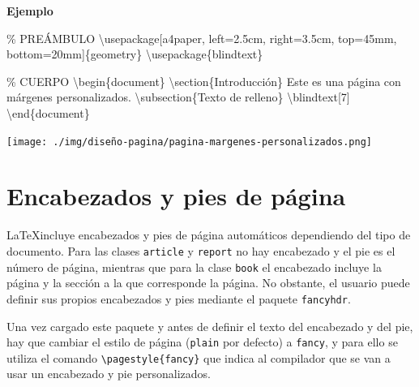 \documentclass[
  letterpaper,
  DIV=11,
  numbers=noendperiod]{scrreport}
\newenvironment{Shaded}{\begin{snugshade}}{\end{snugshade}}
\newcommand{\BuiltInTok}[1]{\textcolor[rgb]{0.00,0.23,0.31}{#1}}
\newcommand{\CommentTok}[1]{\textcolor[rgb]{0.37,0.37,0.37}{#1}}
\newcommand{\ExtensionTok}[1]{\textcolor[rgb]{0.00,0.23,0.31}{#1}}
\newcommand{\FunctionTok}[1]{\textcolor[rgb]{0.28,0.35,0.67}{#1}}
\newcommand{\KeywordTok}[1]{\textcolor[rgb]{0.00,0.23,0.31}{#1}}
\newcommand{\NormalTok}[1]{\textcolor[rgb]{0.00,0.23,0.31}{#1}}
\begin{document}
\textbf{Ejemplo}

\begin{Shaded}
\begin{Highlighting}[]
\CommentTok{\% PREÁMBULO}
\BuiltInTok{\textbackslash{}usepackage}\NormalTok{[a4paper, left=2.5cm, right=3.5cm, top=45mm, bottom=20mm]\{}\ExtensionTok{geometry}\NormalTok{\}}
\BuiltInTok{\textbackslash{}usepackage}\NormalTok{\{}\ExtensionTok{blindtext}\NormalTok{\}}

\CommentTok{\% CUERPO}
\KeywordTok{\textbackslash{}begin}\NormalTok{\{}\ExtensionTok{document}\NormalTok{\}}
\KeywordTok{\textbackslash{}section}\NormalTok{\{Introducción\}}
\NormalTok{Este es una página con márgenes personalizados.}
\KeywordTok{\textbackslash{}subsection}\NormalTok{\{Texto de relleno\}}
\FunctionTok{\textbackslash{}blindtext}\NormalTok{[7]}
\KeywordTok{\textbackslash{}end}\NormalTok{\{}\ExtensionTok{document}\NormalTok{\}}
\end{Highlighting}
\end{Shaded}

\begin{tcolorbox}[enhanced jigsaw, arc=.35mm, toprule=.15mm, opacitybacktitle=0.6, colback=white, coltitle=black, colbacktitle=quarto-callout-note-color!10!white, breakable, colframe=quarto-callout-note-color-frame, left=2mm, opacityback=0, bottomtitle=1mm, toptitle=1mm, titlerule=0mm, title={Salida}, bottomrule=.15mm, leftrule=.75mm, rightrule=.15mm]
\texttt{[image: ./img/diseño-pagina/pagina-margenes-personalizados.png]}
\end{tcolorbox}

\hypertarget{encabezados-y-pies-de-puxe1gina}{%
\section{Encabezados y pies de
página}\label{encabezados-y-pies-de-puxe1gina}}

\LaTeX incluye encabezados y pies de página automáticos dependiendo
del tipo de documento. Para las clases \texttt{article} y
\texttt{report} no hay encabezado y el pie es el número de página,
mientras que para la clase \texttt{book} el encabezado incluye la página
y la sección a la que corresponde la página. No obstante, el usuario
puede definir sus propios encabezados y pies mediante el paquete
\texttt{fancyhdr}.

Una vez cargado este paquete y antes de definir el texto del encabezado
y del pie, hay que cambiar el estilo de página (\texttt{plain} por
defecto) a \texttt{fancy}, y para ello se utiliza el comando
\texttt{\textbackslash{}pagestyle\{fancy\}} que indica al compilador que
se van a usar un encabezado y pie personalizados.
\end{document}
